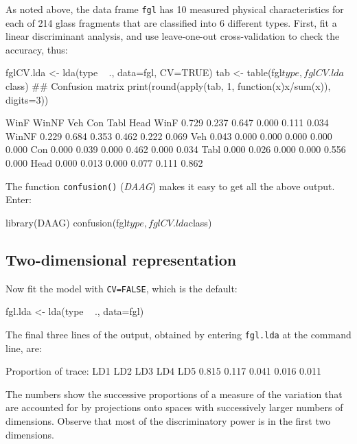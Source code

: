 \documentclass{tufte-book}\usepackage[]{graphicx}\usepackage[]{color}
\newcommand{\txtt}[1]{\texttt{#1}}
\begin{document}
As noted above, the data frame \txtt{fgl} has 10 measured physical
characteristics for each of 214 glass fragments that are classified
into 6 different types.  First, fit a linear discriminant analysis,
and use leave-one-out cross-validation to check the accuracy, thus:
\begin{Schunk}
\begin{Sinput}
fglCV.lda <- lda(type ~ ., data=fgl, CV=TRUE)
tab <- table(fgl$type, fglCV.lda$class)
## Confusion matrix
print(round(apply(tab, 1, function(x)x/sum(x)),
            digits=3))
\end{Sinput}
\begin{Soutput}
       
         WinF WinNF   Veh   Con  Tabl  Head
  WinF  0.729 0.237 0.647 0.000 0.111 0.034
  WinNF 0.229 0.684 0.353 0.462 0.222 0.069
  Veh   0.043 0.000 0.000 0.000 0.000 0.000
  Con   0.000 0.039 0.000 0.462 0.000 0.034
  Tabl  0.000 0.026 0.000 0.000 0.556 0.000
  Head  0.000 0.013 0.000 0.077 0.111 0.862
\end{Soutput}
\end{Schunk}

The function \txtt{confusion()} (\textit{DAAG}) makes it easy to
get all the above output.  Enter:
\begin{Schunk}
\begin{Sinput}
library(DAAG)
confusion(fgl$type, fglCV.lda$class)
\end{Sinput}
\end{Schunk}

\subsection*{Two-dimensional representation}

Now fit the model with \txtt{CV=FALSE}, which is the default:
\begin{Schunk}
\begin{Sinput}
fgl.lda <- lda(type ~ ., data=fgl)
\end{Sinput}
\end{Schunk}
The final three lines of the output, obtained by entering
\txtt{fgl.lda} at the command line, are:
\begin{Schunk}
\begin{Soutput}
Proportion of trace:
  LD1   LD2   LD3   LD4   LD5
0.815 0.117 0.041 0.016 0.011
\end{Soutput}
\end{Schunk}
The numbers show the successive proportions of a measure of the
variation that are accounted for by projections onto spaces with
successively larger numbers of dimensions.  Observe that most of the
discriminatory power is in the first two dimensions.
\end{document}
